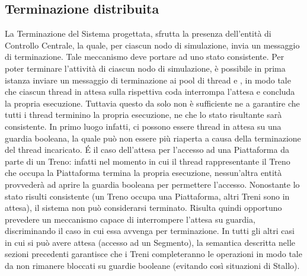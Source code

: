 \newpage
\subsection{Terminazione distribuita}\label{sec:distributed_termination}

La Terminazione del Sistema progettata, sfrutta la presenza dell'entità di Controllo Centrale, la quale, per ciascun nodo di simulazione, invia un messaggio di terminazione. Tale meccanismo deve portare ad uno stato consistente. Per poter terminare l'attività di ciascun nodo di simulazione, è possibile in prima istanza inviare un messaggio di terminazione ai pool di thread  e , in modo tale che ciascun thread in attesa sulla rispettiva coda interrompa l'attesa e concluda la propria esecuzione. Tuttavia questo da solo non è sufficiente ne a garantire che tutti i thread terminino la propria esecuzione, ne che lo stato risultante sarà consistente. In primo luogo infatti, ci possono essere thread in attesa su una guardia booleana, la quale può non essere più riaperta a causa della terminazione del thread incaricato. \'E il caso dell'attesa per l'accesso ad una Piattaforma da parte di un Treno: infatti nel momento in cui il thread rappresentante il Treno che occupa la Piattaforma termina la propria esecuzione, nessun'altra entità provvederà ad aprire la guardia booleana per permettere l'accesso. Nonostante lo stato risulti consistente (un Treno occupa una Piattaforma, altri Treni sono in attesa), il sistema non può considerarsi terminato. Risulta quindi opportuno prevedere un meccanismo capace di interrompere l'attesa su guardia, discriminando il caso in cui essa avvenga per terminazione. In tutti gli altri casi in cui si può avere attesa (accesso ad un Segmento), la semantica descritta nelle sezioni precedenti garantisce che i Treni completeranno le operazioni in modo tale da non rimanere bloccati su guardie booleane (evitando così situazioni di Stallo).

